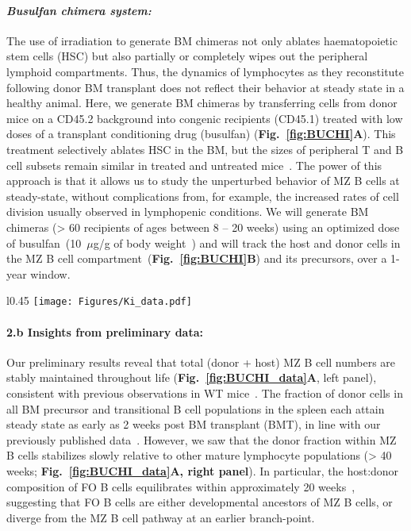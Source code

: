 \documentclass[11pt]{article}
\newcommand{\khi}{\ensuremath{\text{Ki67}^\text{hi}}~}
\newcommand{\para}[1]{\vspace*{-4.5mm}\paragraph{#1}}
\begin{document}
\para{\textit{Busulfan chimera system:}}
The use of irradiation to generate BM chimeras not only ablates haematopoietic stem cells (HSC) but also partially or completely wipes out the peripheral lymphoid compartments.
Thus, the dynamics of lymphocytes as they reconstitute following donor BM transplant does not reflect their behavior at steady state in a healthy animal.
Here, we generate BM chimeras by transferring cells from donor mice on a CD45.2 background into congenic recipients (CD45.1)  treated with low doses of a transplant conditioning drug (busulfan)  (\textbf{Fig.~\ref{fig:BUCHI}A}). 
This treatment selectively ablates HSC in the BM, but the sizes of peripheral T and B cell subsets remain similar in treated and untreated mice~\cite{Hogan_2019}. 
The power of this approach is that it allows us to study the unperturbed behavior of MZ B cells at steady-state, without complications from, for example, the increased rates of cell division usually observed in lymphopenic conditions.
We will generate BM chimeras (> 60 recipients of ages between 8 -- 20 weeks) using an optimized dose of busulfan~(10~$\mu$g/g of body weight~\cite{Hogan_2019}) and will track the host and donor cells in the MZ B cell compartment~(\textbf{Fig.~\ref{fig:BUCHI}B}) and its precursors, over a 1-year window.

\begin{wrapfigure}{l}{0.45\textwidth}
\centering
\vspace*{-3mm}
\texttt{[image: Figures/Ki\_data.pdf]}
\vspace*{-7mm}
\caption{
\textbf{(A)} Kinetics of total numbers and normalized donor fraction of MZ B cells.
\textbf{(B)} Ki67 expression across B cell developmental stages. 
\textbf{(C)} Proportions of \khi cells within host and donor subsets in chimeras.}
\label{fig:BUCHI_data}
\vspace*{-6mm}
\end{wrapfigure}
\para{{2.b Insights from preliminary data:}}
Our preliminary results reveal that total (donor + host) MZ B cell numbers are stably maintained throughout life (\textbf{Fig.~\ref{fig:BUCHI_data}A}, left panel), consistent with previous observations in WT mice~\cite{Hao_2001, Carvalho_2001}.
The fraction of donor cells in all BM precursor and transitional B cell populations in the spleen each attain steady state as early as 2 weeks post BM transplant (BMT), in line with our previously published data~\cite{Verheijen_2020}. 
However, we saw that the donor fraction within MZ B cells stabilizes slowly relative to other mature lymphocyte populations (> 40 weeks; \textbf{Fig.~\ref{fig:BUCHI_data}A, right panel}).
In particular, the host:donor composition of FO B cells equilibrates within approximately 20 weeks~\cite{Verheijen_2020}, suggesting that FO B cells are either developmental ancestors of MZ B cells, or diverge from the MZ B cell pathway at an earlier branch-point.
\end{document}
